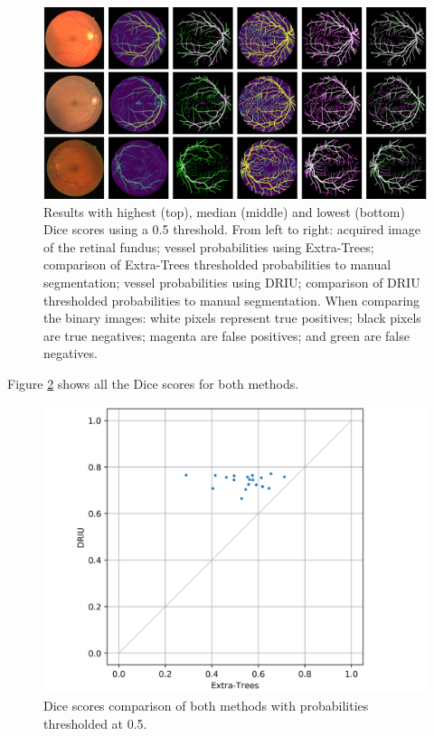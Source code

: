 \begin{figure}
  \includegraphics[width=\textwidth]{figures/collage}
  \caption{Results with highest (top), median (middle) and lowest (bottom) Dice scores using a 0.5 threshold. From left to right: acquired image of the retinal fundus; vessel probabilities using Extra-Trees; comparison of Extra-Trees thresholded probabilities to manual segmentation; vessel probabilities using DRIU; comparison of DRIU thresholded probabilities to manual segmentation. When comparing the binary images: white pixels represent true positives; black pixels are true negatives; magenta are false positives; and green are false negatives.} \label{fig:collage}
\end{figure}

Figure \ref{fig:dice} shows all the Dice scores for both methods.

\begin{figure}
  \includegraphics[width=\textwidth]{figures/dices}
  \caption{Dice scores comparison of both methods with probabilities thresholded at 0.5.} \label{fig:dice}
\end{figure}
